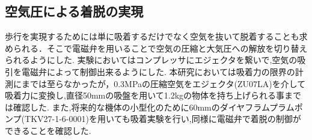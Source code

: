 \documentclass[uplatex,dvipdfmx]{jlreq}
\begin{document}

\subsection{空気圧による着脱の実現}
歩行を実現するためには単に吸着するだけでなく空気を抜いて脱着することも求められる．そこで電磁弁を用いることで空気の圧縮と大気圧への解放を切り替えられるようにした.
実験においてはコンプレッサにエジェクタを繋いで,空気の吸引を電磁弁によって制御出来るようにした.
本研究においては吸着力の限界の計測にまでは至らなかったが，0.3MPaの圧縮空気をエジェクタ(ZU07LA)を介して吸着力に変換し,直径50mmの吸盤を用いて1.2kgの物体を持ち上げられる事までは確認した.
また,将来的な機体の小型化のために60mmのダイヤフラムプラムポンプ(TKV27-1-6-0001)を用いても吸着実験を行い,同様に電磁弁で着脱の制御ができることを確認した.
\end{document}
